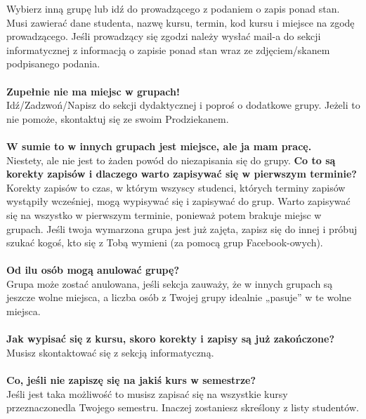 \documentclass[11pt]{article}
\begin{document}
\indent Wybierz inną grupę lub idź do prowadzącego z podaniem o zapis ponad stan. Musi zawierać dane studenta, nazwę kursu, termin, kod kursu i miejsce na zgodę prowadzącego. Jeśli prowadzący się zgodzi należy wysłać mail-a do sekcji informatycznej z informacją o zapisie ponad stan wraz ze zdjęciem/skanem podpisanego podania.\\\\
\textbf{Zupełnie nie ma miejsc w grupach!}\\
\indent Idź/Zadzwoń/Napisz do sekcji dydaktycznej i poproś o dodatkowe grupy. Jeżeli to nie pomoże, skontaktuj się ze swoim Prodziekanem.\\\\
\textbf{W sumie to w innych grupach jest miejsce, ale ja mam pracę.}\\
\indent Niestety, ale nie jest to żaden powód do niezapisania się do grupy.
\newpage
\noindent \textbf{Co to są korekty zapisów i dlaczego warto zapisywać się w pierwszym terminie?}\\
\indent Korekty zapisów to czas, w którym wszyscy studenci, których terminy zapisów wystąpiły wcześniej, mogą wypisywać się i zapisywać do grup. Warto zapisywać się na wszystko w pierwszym terminie, ponieważ potem brakuje miejsc w grupach. Jeśli twoja wymarzona grupa jest już zajęta, zapisz się do innej i próbuj szukać kogoś, kto się z Tobą wymieni (za pomocą grup Facebook-owych).\\\\
\textbf{Od ilu osób mogą anulować grupę?}\\
\indent Grupa może zostać anulowana, jeśli sekcja zauważy, że w innych grupach są jeszcze wolne miejsca, a liczba osób z Twojej grupy idealnie „pasuje” w te wolne miejsca.\\\\
\textbf{Jak wypisać się z kursu, skoro korekty i zapisy są już zakończone?}\\
\indent Musisz skontaktować się z sekcją informatyczną.\\\\
\textbf{Co, jeśli nie zapiszę się na jakiś kurs w semestrze?}\\
\indent Jeśli jest taka możliwość to musisz zapisać się na wszystkie kursy przeznaczone\linebreak dla Twojego semestru. Inaczej zostaniesz skreślony z listy studentów.
\end{document}
